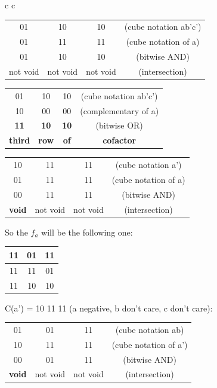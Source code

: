 \begin{center}
	\begin{tabular}{c  c}
		\begin{tabular}{c  c  c c}
			01 & 10 & 10 & (cube notation ab'c') \\ 
			01 & 11 & 11 & (cube notation of a)\\ \hline 
			01 & 10 & 10 & (bitwise AND) \\ \hline
			not void & not void & not void & (intersection)
		\end{tabular}
		\quad
		\quad
		\quad
		\begin{tabular}{c  c  c c}
			01 & 10 & 10 & (cube notation ab'c') \\ 
			10 & 00 & 00 & (complementary of a)\\ \hline 
			\textbf{11} & \textbf{10} & \textbf{10} & (bitwise OR) \\ \hline
			\textbf{third} & \textbf{row} & \textbf{of} & \textbf{cofactor} \\
		\end{tabular}
	\end{tabular}
\end{center}

\begin{center}
		\begin{tabular}{c c c c}
			10 & 11 & 11 & (cube notation a') \\ 
			01 & 11 & 11 & (cube notation of a)\\ \hline 
			00 & 11 & 11 & (bitwise AND) \\ \hline
			\textbf{void} & not void & not void & (intersection)
		\end{tabular}
\end{center}

So the $f_{a}$ will be the following one:

\begin{center}
	\begin{tabular}{c | c | c}
		11 & 01 & 11 \\ \hline
		11 & 11 & 01 \\ \hline 
		11 & 10 & 10 \\ 
	\end{tabular}
\end{center}

C(a') = 10 11 11 (a negative, b don't care, c don't care):

\begin{center}
	\begin{tabular}{c c c c}
		01 & 01 & 11 & (cube notation ab) \\ 
		10 & 11 & 11 & (cube notation of a')\\ \hline 
		00 & 01 & 11 & (bitwise AND) \\ \hline
		\textbf{void} & not void & not void & (intersection)
	\end{tabular}
\end{center}

